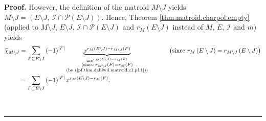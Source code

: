 \documentclass[numbers=enddot,12pt,final,onecolumn,notitlepage]{scrartcl}%
\theoremstyle{definition}
\newenvironment{proof}[1][Proof]{\noindent\textbf{#1.} }{\ \rule{0.5em}{0.5em}}
\newenvironment{verlong}{}{}
\let\sumnonlimits\sum
\renewcommand{\sum}{\sumnonlimits\limits}
\begin{document}
\begin{verlong}
\begin{proof}
However, the definition of the matroid $M\setminus J$ yields $M\setminus
J=\left(  E\setminus J,\ \mathcal{I}\cap\mathcal{P}\left(  E\setminus
J\right)  \right)  $. Hence, Theorem \ref{thm.matroid.charpol.empty} (applied
to $M\setminus J$, $E\setminus J$, $\mathcal{I}\cap\mathcal{P}\left(
E\setminus J\right)  $ and $r_{M}\left(  E\setminus J\right)  $ instead of
$M$, $E$, $\mathcal{I}$ and $m$) yields%
\begin{align}
\widetilde{\chi}_{M\setminus J}  &  =\sum_{F\subseteq E\setminus J}\left(
-1\right)  ^{\left\vert F\right\vert }\underbrace{x^{r_{M}\left(  E\setminus
J\right)  -r_{M\setminus J}\left(  F\right)  }}_{\substack{=x^{r_{M}\left(
E\setminus J\right)  -r_{M}\left(  F\right)  }\\\text{(since }r_{M\setminus
J}\left(  F\right)  =r_{M}\left(  F\right)  \\\text{(by
(\ref{pf.thm.dahlwil.matroid.c1.pf.1}))}}}\ \ \ \ \ \ \ \ \ \ \left(
\text{since }r_{M}\left(  E\setminus J\right)  =r_{M\setminus J}\left(
E\setminus J\right)  \right) \nonumber\\
&  =\sum_{F\subseteq E\setminus J}\left(  -1\right)  ^{\left\vert F\right\vert
}x^{r_{M}\left(  E\setminus J\right)  -r_{M}\left(  F\right)  }.
\label{pf.thm.dahwil.matroid.c1.pf.3}%
\end{align}



\end{proof}
\end{verlong}
\end{document}
